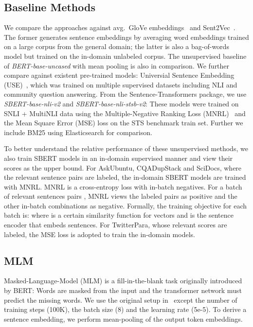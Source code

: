 \documentclass[11pt]{article}
\begin{document}
\subsection{Baseline Methods}
\label{sec:baseline_methods}
We compare the approaches against avg.\ GloVe embeddings~\citep{pennington2014glove} and Sent2Vec~\citep{DBLP:conf/naacl/PagliardiniGJ18}. The former generates sentence embeddings by averaging word embeddings trained on a large corpus from the general domain; the latter is also a bag-of-words model but trained on the in-domain unlabeled corpus. The unsupervised baseline of \textit{BERT-base-uncased} with mean pooling is also in comparison. We further compare against existent pre-trained models: Universial Sentence Embedding (USE)~\citep{DBLP:conf/acl/YangCAGLCAYTSSK20}, which was trained on multiple supervised datasets including NLI and community question answering. From the Sentence-Transformers package, we use \textit{SBERT-base-nli-v2} and \textit{SBERT-base-nli-stsb-v2}: These models were trained on SNLI + MultiNLI data using the Multiple-Negative Ranking Loss (MNRL)~\citep{DBLP:journals/corr/HendersonASSLGK17} and the Mean Square Error (MSE) loss on the STS benchmark train set. Further we include BM25 using Elasticsearch for comparison.

To better understand the relative performance of these unsupervised methods, we also train SBERT models in an in-domain supervised manner and view their scores as the upper bound. For AskUbuntu, CQADupStack and SciDocs, where the relevant sentence pairs are labeled, the in-domain SBERT models are trained with MNRL. MNRL is a cross-entropy loss with in-batch negatives. For a batch of relevant sentences pairs , MNRL views the labeled pairs as positive and the other in-batch combinations as negative. Formally, the training objective for each batch is:
where  is a certain similarity function for vectors and  is the sentence encoder that embeds sentences. For TwitterPara, whose relevant scores are labeled, the MSE loss is adopted to train the in-domain models.

\subsection{MLM} 
Masked-Language-Model (MLM) is a fill-in-the-blank task originally introduced by BERT: Words are masked from the input and the transformer network must predict the missing words. We use the original setup in~\citet{DBLP:conf/naacl/DevlinCLT19} except the number of training steps (100K), the batch size (8) and the learning rate (5e-5). To derive a sentence embedding, we perform mean-pooling of the output token embeddings.
\end{document}
